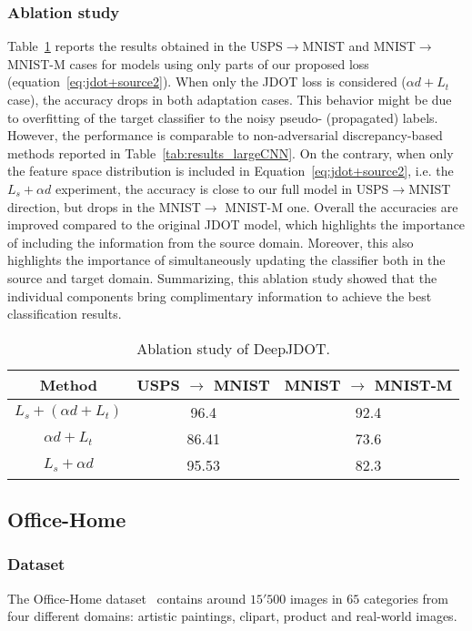 \documentclass[runningheads]{llncs}
\begin{document}
\subsubsection{Ablation study} 
Table~\ref{tab:ablation} reports the results obtained in the USPS$\rightarrow$MNIST and MNIST$\rightarrow$ MNIST-M cases for models using only parts of our proposed loss (equation~\eqref{eq:jdot+source2}).
When only the JDOT loss is considered ($\alpha d+L_t$ case), the accuracy drops in both adaptation cases. This behavior might be due to overfitting of the target classifier to the noisy pseudo- (propagated) labels. However, the performance is comparable to non-adversarial discrepancy-based methods reported in Table~\ref{tab:results_largeCNN}. On the contrary, when only the feature space distribution is included in Equation~\eqref{eq:jdot+source2}, i.e. the $L_s+\alpha d$ experiment, the accuracy is close to our full model in USPS$\rightarrow$MNIST direction, but drops in the MNIST$\rightarrow$ MNIST-M one. Overall the accuracies are improved compared to the original JDOT model, which highlights the importance of including the information from the source domain. Moreover, this also highlights the importance of simultaneously updating the classifier both in the source and target domain. Summarizing, this ablation study showed that the individual components bring complimentary information to achieve the best classification results.


\begin{table}[t]
\centering
\caption{Ablation study of DeepJDOT.}
\begin{tabular}{c|c|c}
\hline
Method
  & USPS $\rightarrow$ MNIST &  MNIST $\rightarrow$ MNIST-M\\
\hline
$L_s+(\alpha d+L_t)$& 96.4  & 92.4\\
$\alpha d+L_t$  &86.41 &73.6\\
$L_s+\alpha d$  & 95.53& 82.3\\\hline
\end{tabular}
\label{tab:ablation}
\end{table}








\subsection{Office-Home}\label{sec:officehome}

\subsubsection*{Dataset} The Office-Home dataset~\cite{venkateswara2017} contains around $15'500$ images in $65$ categories from four different domains: artistic paintings, clipart, product and real-world images.
\end{document}

